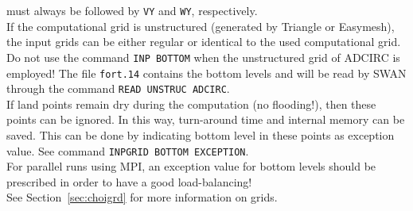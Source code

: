 \documentclass[12pt]{book}
\begin{document}
must always be followed by {\tt VY} and {\tt WY}, respectively.
\\[2ex]
\noindent
If the computational grid is unstructured (generated by Triangle or Easymesh), the input grids can be either regular
or identical to the used computational grid.
\\[2ex]
\noindent
Do not use the command {\tt INP BOTTOM} when the unstructured grid of ADCIRC is employed!
The file {\tt fort.14} contains the bottom levels and will be read by SWAN through the command {\tt READ UNSTRUC ADCIRC}.
\\[2ex]
\noindent
If land points remain dry during the computation (no flooding!), then these points can be ignored.
In this way, turn-around time and internal memory can be saved. This can be done by indicating bottom level in these points as
exception value. See command {\tt INPGRID BOTTOM EXCEPTION}.
\\[2ex]
\noindent
For parallel runs using MPI, an exception value for bottom levels should be prescribed in order
to have a good load-balancing!
\\[2ex]
\noindent
See Section~\ref{sec:choigrd} for more information on grids.
\end{document}
